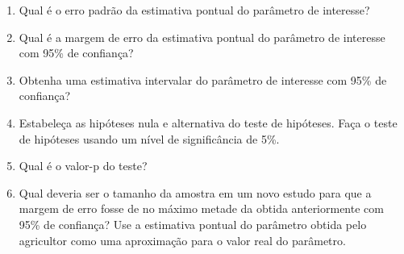 \documentclass[
]{article}
\begin{document}
\begin{enumerate}
\begin{enumerate}
\item Qual é o erro padrão da estimativa pontual do parâmetro de interesse?

\item Qual é a margem de erro da estimativa pontual do parâmetro de interesse com 95\% de confiança?

\item Obtenha uma estimativa intervalar do parâmetro de interesse com 95\% de confiança?

\item Estabeleça as hipóteses nula e alternativa do teste de hipóteses. Faça o teste de hipóteses usando um nível de significância de 5\%.


 

\item Qual é o valor-p do teste?

\item Qual deveria ser o tamanho da amostra em um novo estudo para que a margem de erro fosse de no máximo metade da obtida anteriormente com 95\% de confiança? Use a estimativa pontual do parâmetro obtida pelo agricultor como uma aproximação para o valor real do parâmetro.



\end{enumerate}

\end{enumerate}
\end{document}
